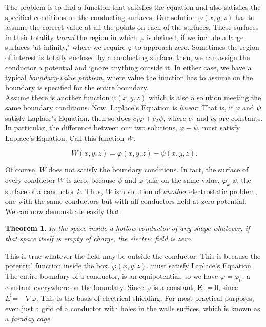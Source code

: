 \documentclass[svgnames]{article}
\newtheorem{theorem}{Theorem}		%
\begin{document}
The problem is to find a function that satisfies the equation and also
satisfies the specified conditions on the conducting surfaces. Our solution
$\varphi (x,y,z)$ has to assume the correct value at all the points on each of
the surfaces. These surfaces in their totality \textit{bound} the region in
which $\varphi$ is defined, if we include a large surfaces "at infinity," where
we require $\varphi$ to approach zero. Sometimes the region of interest is
totally enclosed by a conducting surface; then, we can assign the conductor
a potential and ignore anything outside it. In either case, we have a typical
\textit{boundary-value problem}, where value the function has to assume
on the boundary is specified for the entire boundary.\\

Assume there is another function $\psi(x,y,z)$ which is also a solution
meeting the same boundary conditions. Now, Laplace's Equation is
\textit{linear}. That is, if $\varphi$ and $\psi$ satisfy Laplace's
Equation, then so does $c_1\varphi + c_2\psi$, where $c_1$ and $c_2$ are
constants. In particular, the difference between our two solutions, $\varphi
- \psi$, must satisfy Laplace's Equation. Call this function $W$. 

\[
W(x,y,z) = \varphi(x,y,z) - \psi(x,y,z)
.\] 

Of course, $W$ does not satisfy the boundary conditions. In fact, the surface
of every conductor $W$ is zero, because $\psi$ and $\varphi$ take on the same
value, $\varphi_k$ at the surface of a conductor $k$. Thus, $W$ is a solution
of \textit{another} electrostatic problem, one with the same conductors but
with all conductors held at zero potential. \\

We can now demonstrate easily that 

\begin{theorem}
  In the space inside a hollow conductor of any shape whatever, if that space
  itself is empty of charge, the electric field is zero.
\end{theorem} 

This is true whatever the field may be outside the conductor. This is because
the potential function inside the box, $\varphi(x,y,z)$, must satisfy Laplace's
Equation. The entire boundary of a conductor, is an equipotential, so we have
$\varphi = \varphi_0$, a constant everywhere on the boundary. Since $\varphi$
is a constant, \textbf{E} $= 0$, since $\vec{E} = -\nabla \varphi$. This is the
basis of electrical shielding. For most practical purposes, even just a grid of
a conductor with holes in the walls suffices, which is known as
a \textit{faraday cage}
\end{document}
